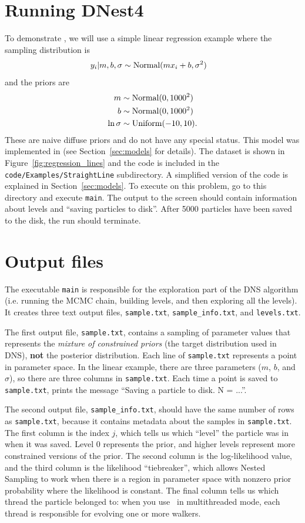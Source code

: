 \documentclass[article]{jss}
\newcommand{\dnest}{\pkg{DNest4}}
\begin{document}
\section{Running DNest4}\label{sec:running}
To demonstrate ,
we will use a simple linear regression example where the
sampling distribution is
\begin{align}
y_i | m, b, \sigma &\sim \textnormal{Normal}(mx_i + b, \sigma^2)
\end{align}
and the priors are
\begin{align}
m &\sim \textnormal{Normal}(0, 1000^2)\\
b &\sim \textnormal{Normal}(0, 1000^2)\\
\ln\sigma &\sim \textnormal{Uniform}(-10, 10).
\end{align}
These are naive diffuse priors and do not have any special status.
This model was implemented in 
(see Section~\ref{sec:models} for details).
The dataset is shown in Figure~\ref{fig:regression_lines}
and the code is included in the {\tt code/Examples/StraightLine}
subdirectory. A simplified version of the
code is explained in Section~\ref{sec:models}.
To execute  on this problem, go to this directory and
execute {\tt main}. The output to the screen
should contain information about levels and ``saving particles to disk''.
After 5000 particles have been saved to the disk, the run should terminate.

\section{Output files}
The executable {\tt main} is responsible for the exploration part of the
DNS algorithm (i.e. running the MCMC chain, building
levels, and then exploring all the levels). It creates three text output files,
{\tt sample.txt}, {\tt sample\_info.txt}, and {\tt levels.txt}.

The first output
file, {\tt sample.txt}, contains a sampling of parameter values that
represents the {\it mixture of constrained priors} (the target distribution
used in DNS), {\bf not} the
posterior distribution. Each line of {\tt sample.txt} represents a point in
parameter space. In the linear example, there are three parameters
($m$, $b$, and $\sigma$), so there
are three columns in {\tt sample.txt}.
Each time a point is saved to {\tt sample.txt},  prints
the message ``Saving a particle to disk. N = ...''.

The second output file, {\tt sample\_info.txt}, should have the same number of
rows as {\tt sample.txt}, because it contains metadata about the samples in
{\tt sample.txt}. The first
column is the index $j$, which tells us which ``level'' the particle was in
when it was saved. Level 0 represents the prior, and higher levels represent
more constrained versions of the prior.
The second column is the log-likelihood value, and the third column is
the likelihood ``tiebreaker'', which allows Nested Sampling to work when
there is a region in parameter space with nonzero prior probability where the
likelihood is constant. The final column tells us which thread the particle
belonged to: when you use \dnest~in multithreaded mode, each thread
is responsible for evolving one or more walkers.
\end{document}
